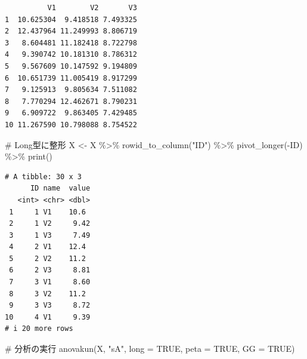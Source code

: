 \documentclass[
  a4paper,
]{ltjsbook}
\newenvironment{Shaded}{\begin{snugshade}}{\end{snugshade}}
\newcommand{\AttributeTok}[1]{\textcolor[rgb]{0.40,0.45,0.13}{#1}}
\newcommand{\CommentTok}[1]{\textcolor[rgb]{0.37,0.37,0.37}{#1}}
\newcommand{\ConstantTok}[1]{\textcolor[rgb]{0.56,0.35,0.01}{#1}}
\newcommand{\FunctionTok}[1]{\textcolor[rgb]{0.28,0.35,0.67}{#1}}
\newcommand{\NormalTok}[1]{\textcolor[rgb]{0.00,0.23,0.31}{#1}}
\newcommand{\OtherTok}[1]{\textcolor[rgb]{0.00,0.23,0.31}{#1}}
\newcommand{\SpecialCharTok}[1]{\textcolor[rgb]{0.37,0.37,0.37}{#1}}
\newcommand{\StringTok}[1]{\textcolor[rgb]{0.13,0.47,0.30}{#1}}
\begin{document}
\begin{verbatim}
          V1        V2       V3
1  10.625304  9.418518 7.493325
2  12.437964 11.249993 8.806719
3   8.604481 11.182418 8.722798
4   9.390742 10.181310 8.786312
5   9.567609 10.147592 9.194809
6  10.651739 11.005419 8.917299
7   9.125913  9.805634 7.511082
8   7.770294 12.462671 8.790231
9   6.909722  9.863405 7.429485
10 11.267590 10.798088 8.754522
\end{verbatim}

\begin{Shaded}
\begin{Highlighting}[]
\CommentTok{\# Long型に整形}
\NormalTok{X }\OtherTok{\textless{}{-}}\NormalTok{ X }\SpecialCharTok{\%\textgreater{}\%}
  \FunctionTok{rowid\_to\_column}\NormalTok{(}\StringTok{"ID"}\NormalTok{) }\SpecialCharTok{\%\textgreater{}\%}
  \FunctionTok{pivot\_longer}\NormalTok{(}\SpecialCharTok{{-}}\NormalTok{ID) }\SpecialCharTok{\%\textgreater{}\%}
  \FunctionTok{print}\NormalTok{()}
\end{Highlighting}
\end{Shaded}

\begin{verbatim}
# A tibble: 30 x 3
      ID name  value
   <int> <chr> <dbl>
 1     1 V1    10.6 
 2     1 V2     9.42
 3     1 V3     7.49
 4     2 V1    12.4 
 5     2 V2    11.2 
 6     2 V3     8.81
 7     3 V1     8.60
 8     3 V2    11.2 
 9     3 V3     8.72
10     4 V1     9.39
# i 20 more rows
\end{verbatim}

\begin{Shaded}
\begin{Highlighting}[]
\CommentTok{\# 分析の実行}
\FunctionTok{anovakun}\NormalTok{(X, }\StringTok{"sA"}\NormalTok{, }\AttributeTok{long =} \ConstantTok{TRUE}\NormalTok{, }\AttributeTok{peta =} \ConstantTok{TRUE}\NormalTok{, }\AttributeTok{GG =} \ConstantTok{TRUE}\NormalTok{)}
\end{Highlighting}
\end{Shaded}
\end{document}
